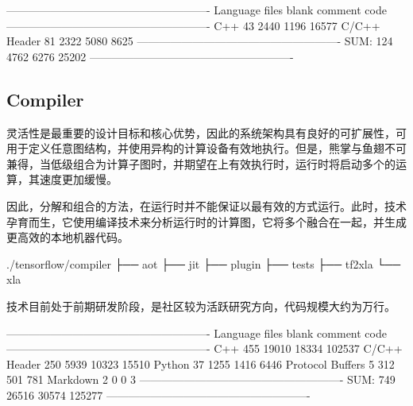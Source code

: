 \begin{content}
\begin{leftbar}
\begin{python}[caption={StreamExecutor代码统计}]
-------------------------------------------------------
Language            files     blank   comment      code
-------------------------------------------------------
C++                    43      2440      1196     16577
C/C++ Header           81      2322      5080      8625
-------------------------------------------------------
SUM:                  124      4762      6276     25202
-------------------------------------------------------
\end{python}
\end{leftbar}

\subsection{Compiler}

灵活性是\tf{}最重要的设计目标和核心优势，因此\tf{}的系统架构具有良好的可扩展性，\tf{}可用于定义任意图结构，并使用异构的计算设备有效地执行。但是，熊掌与鱼翅不可兼得，当低级组合为计算子图时，并期望在上有效执行时，运行时将启动多个的运算，其速度更加缓慢。

因此，\tf{}分解和组合的方法，在运行时并不能保证以最有效的方式运行。此时，技术孕育而生，它使用编译技术来分析运行时的计算图，它将多个融合在一起，并生成更高效的本地机器代码。

\begin{leftbar}
\begin{python}[caption={Compiler源码结构}]
./tensorflow/compiler
├── aot
├── jit
├── plugin
├── tests
├── tf2xla
└── xla
\end{python}
\end{leftbar}

技术目前处于前期研发阶段，是\tf{}社区较为活跃研究方向，代码规模大约为万行。

\begin{leftbar}
\begin{python}[caption={Compiler代码统计}]
-------------------------------------------------------
Language            files     blank   comment      code
-------------------------------------------------------
C++                   455     19010     18334    102537
C/C++ Header          250      5939     10323     15510
Python                 37      1255      1416      6446
Protocol Buffers        5       312       501       781
Markdown                2         0         0         3
-------------------------------------------------------
SUM:                  749     26516     30574    125277
-------------------------------------------------------
\end{python}
\end{leftbar}

\end{content}

